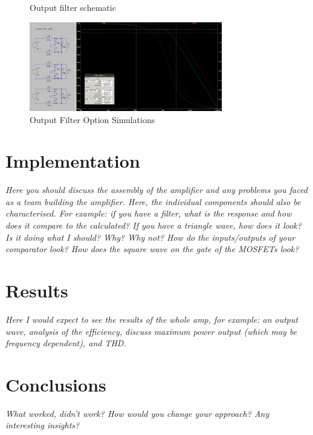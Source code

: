 \documentclass[11pt]{article}
\begin{document}
\begin{figure}[h!]
  \centering
  \caption{Output filter schematic}
\end{figure}

\begin{figure}[h!]
  \centering
  \includegraphics[width=0.75\textwidth]{img/output_filter_sim.png}
  \caption{Output Filter Option Simulations}
\end{figure}


\newpage
\section{Implementation}
 
\textit{Here you should discuss the assembly of the amplifier and any problems you faced as a team building the amplifier.
Here, the individual components should also be characterised. For example: if you have a filter, what is the response and how does it compare to the calculated? If you have a triangle wave, how does it look? Is it doing what I should? Why? Why not? How do the inputs/outputs of your comparator look? How does the square wave on the gate of the MOSFETs look?}
 
\newpage
\section{Results}
 
\textit{Here I would expect to see the results of the whole amp, for example: an output wave, analysis of the efficiency, discuss maximum power output (which may be frequency dependent), and THD.} 
 
\newpage
\section{Conclusions}
 
\textit{What worked, didn’t work? How would you change your approach? Any interesting insights?}
 
\end{document}
